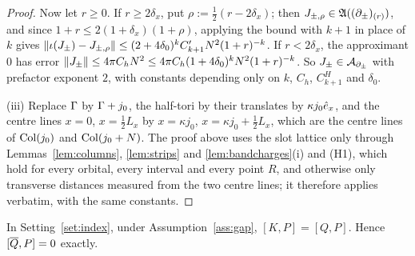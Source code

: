 \begin{proof}
Now let $r\ge0$. If $r\ge2\delta_x$, put $\rho:=\frac12(r-2\delta_x)$; then $J_{\pm,\rho}\in\mathfrak{A}((\partial_\pm)_{(r)})$, and
since $1+r\le2(1+\delta_x)(1+\rho)$, applying the bound with $k+1$ in place of $k$ gives
$\lVert\iota(J_\pm)-J_{\pm,\rho}\rVert\le(2+4\delta_0)^kC'_{k+1}N^2(1+r)^{-k}$. If $r<2\delta_x$, the approximant $0$ has error
$\lVert J_\pm\rVert\le4\pi C_hN^2\le4\pi C_h(1+4\delta_0)^kN^2(1+r)^{-k}$. So $J_\pm\in\mathcal{A}_{\partial_\pm}$ with prefactor exponent
$2$, with constants depending only on $k$, $C_h$, $C^H_{k+1}$ and $\delta_0$.

(iii) Replace $\Gamma$ by $\Gamma+j_0$, the half-tori by their translates by $\kappa j_0\hat{e}_x$, and the centre lines $x=0$,
$x=\frac12L_x$ by $x=\kappa j_0$, $x=\kappa j_0+\frac12L_x$, which are the centre lines of $\mathrm{Col}(j_0)$ and $\mathrm{Col}(j_0+N)$.
The proof above uses the slot lattice only through Lemmas~\ref{lem:columns}, \ref{lem:strips} and
\ref{lem:bandcharges}(i) and (H1), which hold for every orbital, every interval and every point $R$, and otherwise
only transverse distances measured from the two centre lines; it therefore applies verbatim, with the same
constants.
\end{proof}

\begin{lemma}\label{lem:KP}
In Setting~\ref{set:index}, under Assumption~\ref{ass:gap}, $[K,P]=[Q,P]$. Hence $[\overline{Q},P]=0$ exactly.
\end{lemma}

